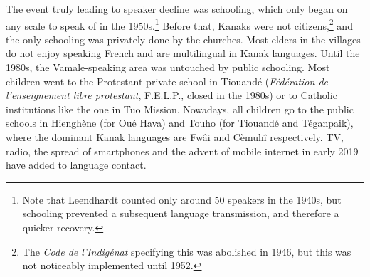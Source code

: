 The event truly leading to speaker decline was schooling, which only began on any scale to speak of in the 1950s.\footnote{Note that Leendhardt counted only around 50 speakers in the 1940s, but schooling prevented a subsequent language transmission, and therefore a quicker recovery.} Before that, Kanaks were not citizens,\footnote{The \textit{Code de l'Indigénat} specifying this was abolished in 1946, but this was not noticeably implemented until 1952.} and the only schooling was privately done by the churches. Most elders in the villages do not enjoy speaking French and are multilingual in Kanak languages. Until the 1980s, the Vamale-speaking area was untouched by public schooling. Most children went to the Protestant private school in Tiouandé (\textit{Fédération de l'enseignement libre protestant}, F.E.L.P., closed in the 1980s) or to Catholic institutions like the one in Tuo Mission. Nowadays, all children go to the public schools in Hienghène (for Oué Hava) and Touho (for Tiouandé and Téganpaik), where the dominant Kanak languages are Fwâi and Cèmuhî respectively. TV, radio, the spread of smartphones and the advent of mobile internet in early 2019 have added to language contact. 




